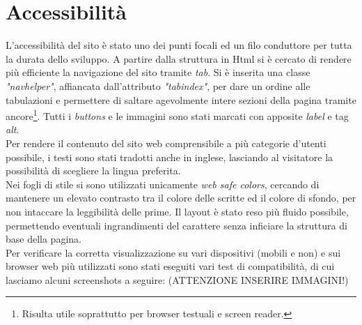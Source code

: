 \section{Accessibilità}
\label{sec:access}
L'accessibilità del sito è stato uno dei punti focali ed un filo conduttore per tutta la durata dello sviluppo. A partire dalla struttura in Html si è cercato di rendere più efficiente la navigazione del sito tramite \emph{tab}. Si è inserita una classe \emph{"navhelper"}, affiancata dall'attributo \emph{"tabindex"}, per dare un ordine alle tabulazioni e permettere di saltare agevolmente intere sezioni della pagina tramite ancore\footnote{Risulta utile soprattutto per browser testuali e screen reader.}. 
Tutti i \emph{buttons} e le immagini sono stati marcati con apposite \emph{label} e tag \emph{alt}.\\
Per rendere il contenuto del sito web comprensibile a più categorie d'utenti possibile, i testi sono stati tradotti anche in inglese, lasciando al visitatore la possibilità di scegliere la lingua preferita.\\
Nei fogli di stile si sono utilizzati unicamente \emph{web safe colors}, cercando di mantenere un elevato contrasto tra il colore delle scritte ed il colore di sfondo, per non intaccare la leggibilità delle prime. Il layout è stato reso più fluido possibile, permettendo eventuali ingrandimenti del carattere senza inficiare la struttura di base della pagina.\\
Per verificare la corretta visualizzazione su vari dispositivi (mobili e non) e sui browser web più utilizzati sono stati eseguiti vari test di compatibilità, di cui lasciamo alcuni screenshots a seguire: (ATTENZIONE INSERIRE IMMAGINI!)
